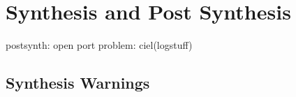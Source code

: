 \documentclass[]{article}
\begin{document}


\section{Synthesis and Post Synthesis} %
\label{sec:synthesis_and_post_synthesis}

postsynth: open port problem: ciel(logstuff)

\subsection{Synthesis Warnings} %
\label{sub:synthesis_warnings}
\end{document}
